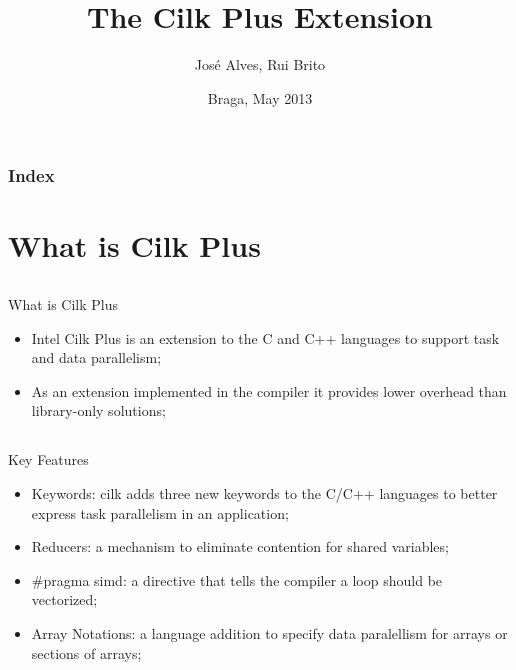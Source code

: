 \documentclass{beamer}
\title{The Cilk Plus Extension}
\author{José Alves, Rui Brito}
\institute[pg22765, pg22781]{
	Universidade do Minho
}
\date{Braga, May 2013}
\begin{document}

\maketitle%

\begin{frame}
	\frametitle{Index}
	\tableofcontents
\end{frame}


\section{What is Cilk Plus}
\subsection{}
\begin{frame}
	\begin{block}{What is Cilk Plus}
			\begin{itemize}
				\item Intel Cilk Plus is an extension to the C and C++ languages to support task and data parallelism;
				\item As an extension implemented in the compiler it provides lower overhead than library-only solutions;
			\end{itemize}		
	\end{block}
\end{frame}

\subsection{}
\begin{frame}
	\begin{block}{Key Features}
			\begin{itemize}
				\item Keywords: cilk adds three new keywords to the C/C++ languages to better express task parallelism in an application;
				\item Reducers: a mechanism to eliminate contention for shared variables;
				\item \#pragma simd: a directive that tells the compiler a loop should be vectorized;
				\item Array Notations: a language addition to specify data paralellism for arrays or sections of arrays;  				
			\end{itemize}		
	\end{block}
\end{frame}
\end{document}
